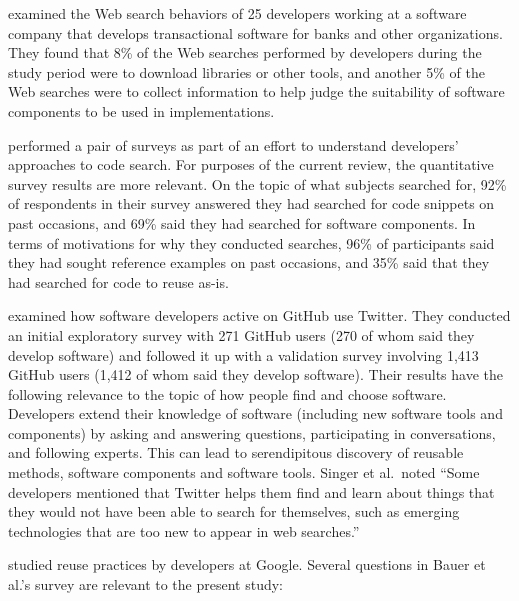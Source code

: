 \documentclass[review]{elsarticle}
\begin{document}
\citet{gallardo2011kinds} examined the Web search behaviors of 25 developers working at a software company that develops transactional software for banks and other organizations.  They found that 8\% of the Web searches performed by developers during the study period were to download libraries or other tools, and another 5\% of the Web searches were to collect information to help judge the suitability of software components to be used in implementations.

\citet{sim2012software} performed a pair of surveys as part of an effort to understand developers' approaches to code search.  For purposes of the current review, the quantitative survey results are more relevant.  On the topic of what subjects searched for, 92\% of respondents in their survey answered they had searched for code snippets on past occasions, and 69\% said they had searched for software components.  In terms of motivations for why they conducted searches, 96\% of participants said they had sought reference examples on past occasions, and 35\% said that they had searched for code to reuse as-is.

\citet{singer2014software} examined how software developers active on GitHub use Twitter.  They conducted an initial exploratory survey with 271 GitHub users (270 of whom said they develop software) and followed it up with a validation survey involving 1,413 GitHub users (1,412 of whom said they develop software).  Their results have the following relevance to the topic of how people find and choose software.  Developers extend their knowledge of software (including new software tools and components) by asking and answering questions, participating in conversations, and following experts.  This can lead to serendipitous discovery of reusable methods, software components and software tools.  Singer et al.\ noted ``Some developers mentioned that Twitter helps them find and learn about things that they would not have been able to search for themselves, such as emerging technologies that are too new to appear in web searches.''

\citet{bauer2014exploratory} studied reuse practices by developers at Google.  Several questions in Bauer et al.'s survey are relevant to the present study:
\end{document}

